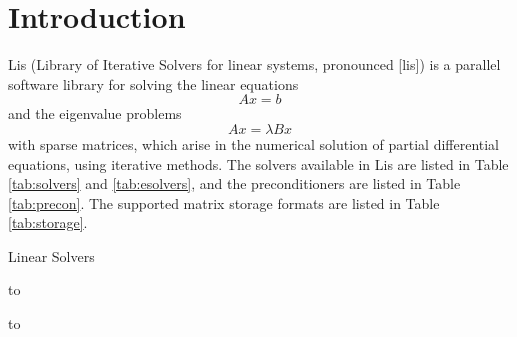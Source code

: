 \documentclass[a4paper]{article}
\begin{document}
\newpage
\section{Introduction}
Lis (Library of Iterative Solvers for linear systems, pronounced [lis])
is a parallel software library for solving the linear equations
\[
 Ax = b
\]
and the eigenvalue problems
\[
 Ax = \lambda Bx
\]
with sparse matrices, which arise in the numerical solution of
partial differential equations, using iterative methods\cite{nishida}.
The solvers available in Lis are listed in Table \ref{tab:solvers} and
\ref{tab:esolvers}, and the preconditioners are listed in Table \ref{tab:precon}.
The supported matrix storage formats are listed in Table \ref{tab:storage}.

\begin{table}[htb]
\begin{minipage}[t]{0.50\textwidth}
\caption{Linear Solvers} 
\vspace*{1mm}
\label{tab:solvers}
\hbox to
\end{minipage}
\hspace*{-8mm}
\begin{minipage}[t]{0.30\textwidth}
\caption{Eigensolvers} 
\vspace*{1mm}
\label{tab:esolvers}
\hbox to
\end{minipage}
\end{table}
\end{document}
